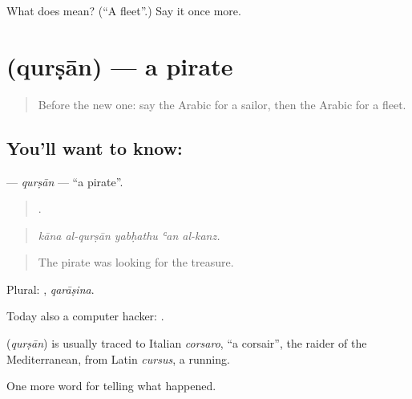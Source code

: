 \begin{tcolorbox}[breakable,colback=teal!4,colframe=teal!35!black,title={Before you move on}]
What does  mean? (\textquotedblleft{}A fleet\textquotedblright{}.) Say it once more.
\end{tcolorbox}
\section[\texorpdfstring{\ar{قرصان} (qurṣān)}{قرصان (qurṣān)}]{ (qurṣān) — a pirate}

\label{lesson:AR-C333-qursan}



\begin{quote}
Before the new one: say the Arabic for a sailor, then the Arabic for a fleet.
\end{quote}

\subsection*{You'll want to know: }
\textbf{} — \emph{qurṣān} — \textquotedblleft{}a pirate\textquotedblright{}.

\begin{quote}
    .
\end{quote}

\begin{quote}
\emph{kāna al-qurṣān yabḥathu ʿan al-kanz.}
\end{quote}

\begin{quote}
The pirate was looking for the treasure.
\end{quote}

Plural: , \emph{qarāṣina}.

Today also a computer hacker:  .

\begin{cousinweb}
\textbf{} (\emph{qurṣān}) is usually traced to Italian \emph{corsaro}, \textquotedblleft{}a corsair\textquotedblright{}, the raider of the Mediterranean, from Latin \emph{cursus}, a running.
\end{cousinweb}

\begin{grammarlens}[title={What you've built}]
One more word for telling what happened.
\end{grammarlens}

